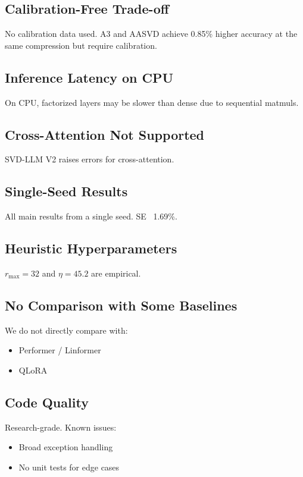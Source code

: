 \subsection{Calibration-Free Trade-off}

No calibration data used. A3 and AASVD achieve 0.85\% higher accuracy 
at the same compression but require calibration.

\subsection{Inference Latency on CPU}

On CPU, factorized layers may be slower than dense due to sequential matmuls.

\subsection{Cross-Attention Not Supported}

SVD-LLM V2 raises errors for cross-attention.

\subsection{Single-Seed Results}

All main results from a single seed. SE ~1.69\%.

\subsection{Heuristic Hyperparameters}

$r_\text{max} = 32$ and $\eta = 45.2$ are empirical.

\subsection{No Comparison with Some Baselines}

We do not directly compare with:
\begin{itemize}
\item Performer / Linformer
\item QLoRA

\end{itemize}
\subsection{Code Quality}

Research-grade. Known issues:
\begin{itemize}
\item Broad exception handling
\item No unit tests for edge cases

\end{itemize}
